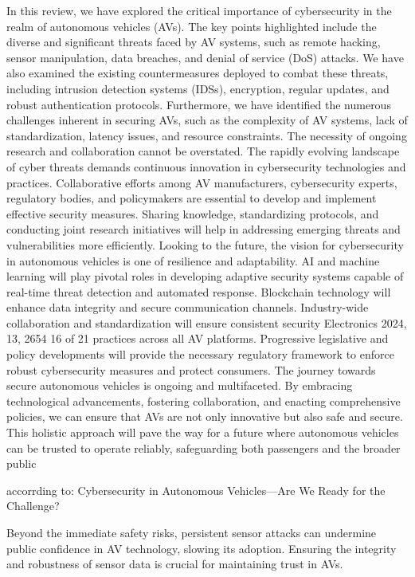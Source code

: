 In this review, we have explored the critical importance of cybersecurity in the realm of
autonomous vehicles (AVs). The key points highlighted include the diverse and significant
threats faced by AV systems, such as remote hacking, sensor manipulation, data breaches,
and denial of service (DoS) attacks. We have also examined the existing countermeasures
deployed to combat these threats, including intrusion detection systems (IDSs), encryption,
regular updates, and robust authentication protocols. Furthermore, we have identified the
numerous challenges inherent in securing AVs, such as the complexity of AV systems, lack
of standardization, latency issues, and resource constraints.
The necessity of ongoing research and collaboration cannot be overstated. The rapidly
evolving landscape of cyber threats demands continuous innovation in cybersecurity technologies and practices. Collaborative efforts among AV manufacturers, cybersecurity
experts, regulatory bodies, and policymakers are essential to develop and implement
effective security measures. Sharing knowledge, standardizing protocols, and conducting joint research initiatives will help in addressing emerging threats and vulnerabilities
more efficiently.
Looking to the future, the vision for cybersecurity in autonomous vehicles is one
of resilience and adaptability. AI and machine learning will play pivotal roles in developing adaptive security systems capable of real-time threat detection and automated
response. Blockchain technology will enhance data integrity and secure communication
channels. Industry-wide collaboration and standardization will ensure consistent security
Electronics 2024, 13, 2654 16 of 21
practices across all AV platforms. Progressive legislative and policy developments will
provide the necessary regulatory framework to enforce robust cybersecurity measures and
protect consumers.
The journey towards secure autonomous vehicles is ongoing and multifaceted. By
embracing technological advancements, fostering collaboration, and enacting comprehensive policies, we can ensure that AVs are not only innovative but also safe and secure. This
holistic approach will pave the way for a future where autonomous vehicles can be trusted
to operate reliably, safeguarding both passengers and the broader public

accorrding to: Cybersecurity in Autonomous Vehicles—Are We Ready for
the Challenge?


Beyond the immediate safety risks, persistent sensor attacks can undermine public confidence in AV technology, slowing its adoption.
Ensuring the integrity and robustness of sensor data is crucial for maintaining trust in AVs.

